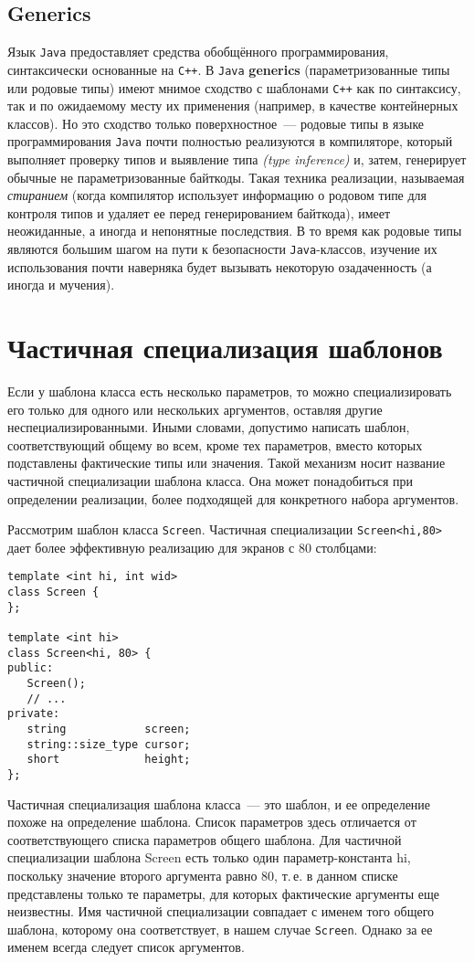 \documentclass[a4paper,10pt]{article}
\begin{document}
\subsection{Generics}
Язык {\tt Java} предоставляет средства обобщённого программирования, синтаксически основанные на {\tt C++}. 
В {\tt Java} {\bf generics} (параметризованные типы или родовые типы) имеют мнимое сходство с шаблонами {\tt C++} как по синтаксису, так и по
ожидаемому месту их применения (например, в качестве контейнерных классов). Но это сходство только поверхностное~--- родовые типы в языке
программирования {\tt Java} почти полностью реализуются в компиляторе, который выполняет проверку типов и выявление типа {\it (type inference)} и,
затем, генерирует обычные не параметризованные байткоды. Такая техника реализации, называемая {\it стиранием} (когда компилятор использует
информацию о родовом типе для контроля типов и удаляет ее перед генерированием байткода), имеет неожиданные, а иногда и непонятные
последствия. В то время как родовые типы являются большим шагом на пути к безопасности {\tt Java}-классов, изучение их использования почти
наверняка будет вызывать некоторую озадаченность (а иногда и мучения).

\section{Частичная специализация шаблонов}
Если у шаблона класса есть несколько параметров, то можно специализировать его только для одного или нескольких аргументов, оставляя другие
неспециализированными. Иными словами, допустимо написать шаблон, соответствующий общему во всем, кроме тех параметров, вместо которых
подставлены фактические типы или значения. Такой механизм носит название частичной специализации шаблона класса. Она может понадобиться при
определении реализации, более подходящей для конкретного набора аргументов.

Рассмотрим шаблон класса {\tt Screen}. Частичная специализации {\tt Screen<hi,80>} дает более эффективную реализацию для экранов с 80
столбцами:
{\small\begin{lstlisting}
template <int hi, int wid>
class Screen {
};

template <int hi>
class Screen<hi, 80> {
public:
   Screen();
   // ...
private:
   string            screen;
   string::size_type cursor;
   short             height;
};
\end{lstlisting}}

Частичная специализация шаблона класса~--- это шаблон, и ее определение похоже на определение шаблона. Список параметров здесь отличается от
соответствующего списка параметров общего шаблона. Для частичной специализации шаблона Screen есть только один параметр-константа hi,
поскольку значение второго аргумента равно 80, т.\,е. в данном списке представлены только те параметры, для которых фактические аргументы еще
неизвестны.
Имя частичной специализации совпадает с именем того общего шаблона, которому она соответствует, в нашем случае {\tt Screen}. Однако за ее именем
всегда следует список аргументов.  
\end{document}
